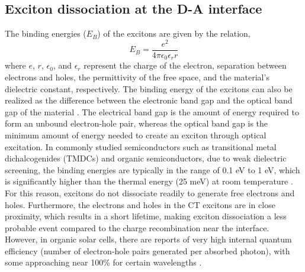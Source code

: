 \documentclass[12pt]{article}
\begin{document}
\subsection{Exciton dissociation at the D-A interface}
The binding energies ($E_B$) of the excitons are given by the relation,
\begin{equation}
    E_B = \frac{e^2}{4\pi\epsilon_0\epsilon_rr}
\end{equation}
where $e$, $r$, $\epsilon_0$, and $\epsilon_r$ represent the charge of the electron, separation between electrons and holes, the permittivity of the free space, and the material's dielectric constant, respectively. The binding energy of the excitons can also be realized as the difference between the electronic band gap and the optical band gap of the material \cite{ugeda2014giant}. The electrical band gap is the amount of energy required to form an unbound electron-hole pair, whereas the optical band gap is the minimum amount of energy needed to create an exciton through optical excitation. In commonly studied semiconductors such as transitional metal dichalcogenides (TMDCs) and organic semiconductors, due to weak dielectric screening, the binding energies are typically in the range of 0.1 eV to 1 eV, which is significantly higher than the thermal energy (25 meV) at room temperature \cite{knupfer2003exciton,pospischil2016optoelectronic}. For this reason, excitons do not dissociate readily to generate free electrons and holes. Furthermore, the electrons and holes in the CT excitons are in close proximity, which results in a short lifetime, making exciton dissociation a less probable event compared to the charge recombination near the interface. However, in organic solar cells, there are reports of very high internal quantum efficiency (number of electron-hole pairs generated per absorbed photon), with some approaching near 100\% for certain wavelengths \cite{park2009bulk}.
\end{document}
